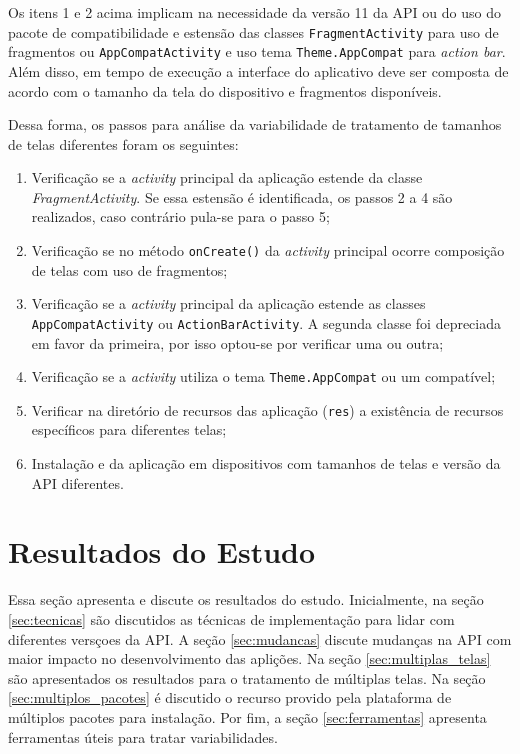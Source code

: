 Os itens 1 e 2 acima implicam na necessidade da versão 11 da API ou do uso do
pacote de compatibilidade e estensão das classes \texttt{FragmentActivity} para
uso de fragmentos ou \texttt{AppCompatActivity} e uso tema \texttt{Theme.AppCompat}
para \textit{action bar}. Além disso, em tempo de execução a interface do aplicativo
deve ser composta de acordo com o tamanho da tela do dispositivo e fragmentos disponíveis.

Dessa forma, os passos para análise da variabilidade de tratamento de tamanhos
de telas diferentes foram os seguintes: 
\begin{enumerate}
    \item Verificação se a \textit{activity} principal da aplicação estende da
        classe \textit{FragmentActivity}. Se essa estensão é identificada, os
        passos 2 a 4 são realizados, caso contrário pula-se para o passo 5;
    \item Verificação se no método \texttt{onCreate()} da \textit{activity}
        principal ocorre composição de telas com uso de fragmentos;
    \item Verificação se a \textit{activity} principal da aplicação estende as
        classes \texttt{AppCompatActivity} ou \texttt{ActionBarActivity}.
        A segunda classe foi depreciada em favor da primeira, por isso optou-se
        por verificar uma ou outra;
    \item Verificação se a \textit{activity} utiliza o tema \texttt{Theme.AppCompat} ou um compatível;
    \item Verificar na diretório de recursos das aplicação (\texttt{res}) a existência
        de recursos específicos para diferentes telas;
    \item Instalação e da aplicação em dispositivos com tamanhos de telas e versão
        da API diferentes.
\end{enumerate}

\section{Resultados do Estudo}
\label{sec:resultados}

Essa seção apresenta e discute os resultados do estudo. Inicialmente, na seção 
\ref{sec:tecnicas} são discutidos as técnicas de implementação para lidar com
diferentes versçoes da API. A seção \ref{sec:mudancas} discute mudanças na API
com maior impacto no desenvolvimento das aplições.
Na seção \ref{sec:multiplas_telas} são apresentados os
resultados para o tratamento de múltiplas telas. Na seção \ref{sec:multiplos_pacotes}
é discutido o recurso provido pela plataforma de múltiplos pacotes para instalação.
Por fim, a seção \ref{sec:ferramentas} apresenta ferramentas úteis para tratar variabilidades. 

